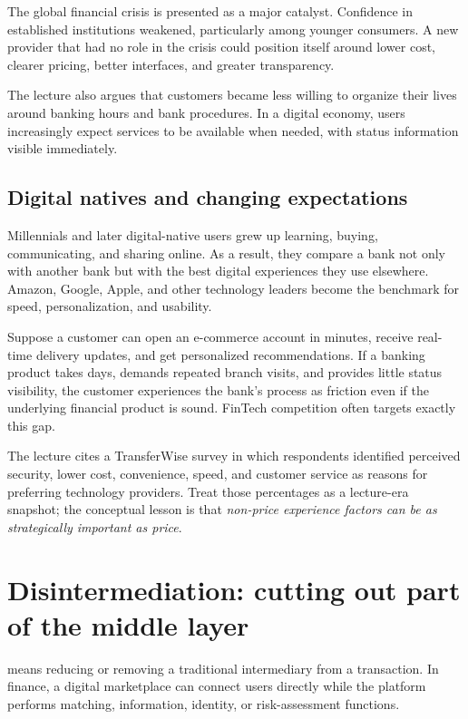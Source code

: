 The global financial crisis is presented as a major catalyst. Confidence in established institutions weakened, particularly among younger consumers. A new provider that had no role in the crisis could position itself around lower cost, clearer pricing, better interfaces, and greater transparency.

The lecture also argues that customers became less willing to organize their lives around banking hours and bank procedures. In a digital economy, users increasingly expect services to be available when needed, with status information visible immediately.

\subsection{Digital natives and changing expectations}

Millennials and later digital-native users grew up learning, buying, communicating, and sharing online. As a result, they compare a bank not only with another bank but with the best digital experiences they use elsewhere. Amazon, Google, Apple, and other technology leaders become the benchmark for speed, personalization, and usability.

\begin{workedexample}
Suppose a customer can open an e-commerce account in minutes, receive real-time delivery updates, and get personalized recommendations. If a banking product takes days, demands repeated branch visits, and provides little status visibility, the customer experiences the bank's process as friction even if the underlying financial product is sound. FinTech competition often targets exactly this gap.
\end{workedexample}

The lecture cites a TransferWise survey in which respondents identified perceived security, lower cost, convenience, speed, and customer service as reasons for preferring technology providers. Treat those percentages as a lecture-era snapshot; the conceptual lesson is that \emph{non-price experience factors can be as strategically important as price}.

\section{Disintermediation: cutting out part of the middle layer}

 means reducing or removing a traditional intermediary from a transaction. In finance, a digital marketplace can connect users directly while the platform performs matching, information, identity, or risk-assessment functions.


